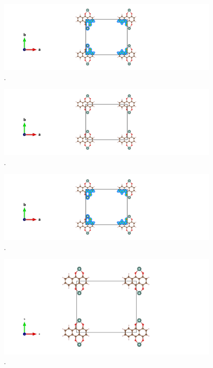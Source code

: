 \documentclass{article}
\begin{document}
  \begin{figure}[H]
      \centering
      \includegraphics[width = 11cm]{../fig/Y_staticbefore_CHGCAR.png}
      \caption{. }
      \label{fig:Y_staticbefore_CHGCAR}
  \end{figure}

  \begin{figure}[H]
      \centering
      \includegraphics[width = 11cm]{../fig/Y_relax_CONTCAR.png}
      \caption{. }
      \label{fig:Y_relax_CONTCAR}
  \end{figure}

  \begin{figure}[H]
      \centering
      \includegraphics[width = 11cm]{../fig/Y_relax_CHGCAR.png}
      \caption{. }
      \label{fig:Y_relax_CHGCAR}
  \end{figure}

  \begin{figure}[H]
      \centering
      \includegraphics[width = 11cm]{../fig/Y_staticafter_CONTCAR.png}
      \caption{. }
      \label{fig:Y_staticafter_CONTCAR}
  \end{figure}
\end{document}
